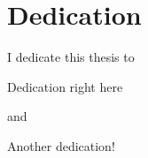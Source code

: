 
\chapter*{Dedication}\label{dedication}
\vspace{7mm}

\begin{center}

I dedicate this thesis to
\vspace{7mm}

Dedication right here
\vspace{7mm}

and
\vspace{7mm}

Another dedication!

    
\end{center}